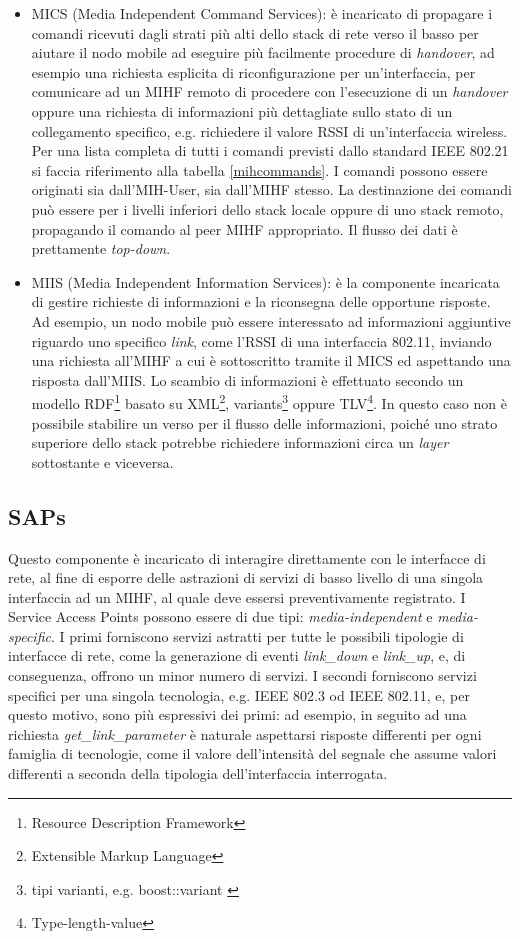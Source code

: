 \begin{itemize}
\item MICS (Media Independent Command Services): è incaricato di propagare i comandi ricevuti dagli strati più alti dello stack di rete verso il basso per aiutare il nodo mobile ad eseguire più facilmente procedure di {\em handover}, ad esempio una richiesta esplicita di riconfigurazione per un'interfaccia, per comunicare ad un MIHF remoto di procedere con l'esecuzione di un {\em handover} oppure una richiesta di informazioni più dettagliate sullo stato di un collegamento specifico, e.g. richiedere il valore RSSI di un'interfaccia wireless. Per una lista completa di tutti i comandi previsti dallo standard IEEE 802.21 si faccia riferimento alla tabella \ref{mihcommands}. I comandi possono essere originati sia dall'MIH-User, sia dall'MIHF stesso. La destinazione dei comandi può essere per i livelli inferiori dello stack locale oppure di uno stack remoto, propagando il comando al peer MIHF appropriato. Il flusso dei dati è prettamente {\em top-down}.

\item MIIS (Media Independent Information Services): è la componente incaricata di gestire richieste di informazioni e la riconsegna delle opportune risposte. Ad esempio, un nodo mobile può essere interessato ad informazioni aggiuntive riguardo uno specifico {\em link}, come l'RSSI di una interfaccia 802.11, inviando una richiesta all'MIHF a cui è sottoscritto tramite il MICS ed aspettando una risposta dall'MIIS. Lo scambio di informazioni è effettuato secondo un modello RDF\footnote{Resource Description Framework} basato su XML\footnote{Extensible Markup Language}, variants\footnote{tipi varianti, e.g. boost::variant \cite{variants}} oppure TLV\footnote{Type-length-value}. In questo caso non è possibile stabilire un verso per il flusso delle informazioni, poiché uno strato superiore dello stack potrebbe richiedere informazioni circa un {\em layer} sottostante e viceversa.
\end{itemize}

\subsection{SAPs}
Questo componente è incaricato di interagire direttamente con le interfacce di rete, al fine di esporre delle astrazioni di servizi di basso livello di una singola interfaccia ad un MIHF, al quale deve essersi preventivamente registrato.
I Service Access Points possono essere di due tipi: {\em media-independent} e {\em media-specific}.
I primi forniscono servizi astratti per tutte le possibili tipologie di interfacce di rete, come la generazione di eventi {\em link\_down} e {\em link\_up}, e, di conseguenza, offrono un minor numero di servizi.
I secondi forniscono servizi specifici per una singola tecnologia, e.g. IEEE 802.3 od IEEE 802.11, e, per questo motivo, sono più espressivi dei primi: ad esempio, in seguito ad una richiesta {\em get\_link\_parameter} è naturale aspettarsi risposte differenti per ogni famiglia di tecnologie, come il valore dell'intensità del segnale che assume valori differenti a seconda della tipologia dell'interfaccia interrogata. 

